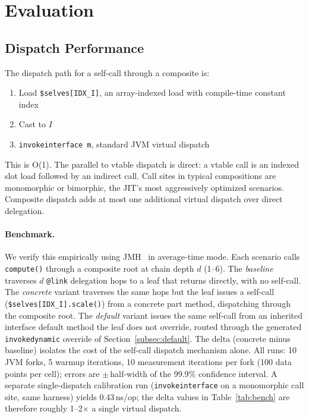 \documentclass[sigplan,10pt,review,anonymous]{acmart}
\theoremstyle{acmplain}
\newcommand{\code}[1]{\texttt{#1}}
\begin{document}
\section{Evaluation}
\label{sec:eval}

\subsection{Dispatch Performance}

The dispatch path for a self-call through a composite is:
\begin{enumerate}
  \item Load \code{\$selves[IDX\_I]}, an array-indexed load with compile-time
        constant index
  \item Cast to $I$
  \item \code{invokeinterface m}, standard JVM virtual dispatch
\end{enumerate}

This is O(1). The parallel to vtable dispatch is direct: a vtable
call is an indexed slot load followed by an indirect call. Call sites in typical
compositions are monomorphic or bimorphic, the JIT's most aggressively optimized
scenarios. Composite dispatch adds at most one additional virtual dispatch over
direct delegation.

\paragraph{Benchmark.}
We verify this empirically using JMH~\cite{jmh} in average-time mode.
Each scenario calls \code{compute()} through a composite root at chain
depth $d$ (1--6). The \emph{baseline} traverses $d$ \code{@link} delegation
hops to a leaf that returns directly, with no self-call. The \emph{concrete}
variant traverses the same hops but the leaf issues a self-call
(\code{\$selves[IDX\_I].scale()}) from a concrete part method,
dispatching through the composite root. The \emph{default} variant issues the
same self-call from an inherited interface default method the leaf does not
override, routed through the generated \code{invokedynamic} override of
Section~\ref{subsec:default}. The delta (concrete minus baseline) isolates the cost of the self-call
dispatch mechanism alone. All runs: 10 JVM forks,
5 warmup iterations, 10 measurement iterations per fork (100 data points per
cell); errors are $\pm$\,half-width of the 99.9\% confidence interval.
A separate single-dispatch calibration run (\code{invokeinterface}
on a monomorphic call site, same harness) yields 0.43\,ns/op; the delta
values in Table~\ref{tab:bench} are therefore roughly 1--2$\times$ a single virtual
dispatch.
\end{document}
